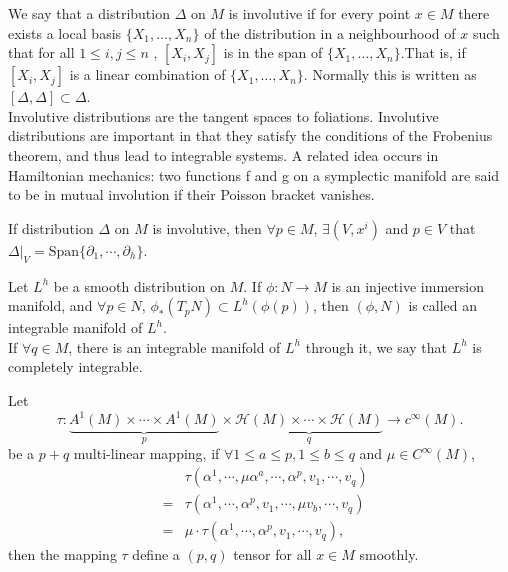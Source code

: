\begin{newdef}
We say that a distribution $\Delta$ on $M$ is involutive if for every point $x \in M$ there exists a local basis $\{X_{1},\ldots ,X_{n}\}$ of the distribution in a neighbourhood of $x$ such that for all $1\leq i,j\leq n$ , $[X_{i},X_{j}]$  is in the span of $\{X_{1},\ldots ,X_{n}\}$.That is, if $[X_{i},X_{j}]$ is a linear combination of $\{X_{1},\ldots ,X_{n}\}$. Normally this is written as $ [\Delta ,\Delta ]\subset \Delta $.\\
Involutive distributions are the tangent spaces to foliations. Involutive distributions are important in that they satisfy the conditions of the Frobenius theorem, and thus lead to integrable systems.
A related idea occurs in Hamiltonian mechanics: two functions f and g on a symplectic manifold are said to be in mutual involution if their Poisson bracket vanishes.
\end{newdef}

\begin{newthem}
 If distribution $\Delta$ on $M$ is involutive, then $\forall p \in M$, $\exists (V,x^i)$ and $p \in V$ that $\Delta|_{V} = \mathrm{Span} \{ \partial_{1} , \cdots, \partial_{h}\}$.
\end{newthem}

\begin{newdef}
Let $L^{h}$ be a smooth distribution on $M$. If $\phi:N \to M$ is an injective immersion manifold, and $\forall p \in N$, $\phi_{*}(T_pN) \subset L^h(\phi(p))$, then $(\phi,N)$ is called an integrable manifold of $L^h$.\\
If $\forall q \in M$, there is an integrable manifold of $L^h$ through it, we say that $L^h$ is completely integrable.
\end{newdef}
\begin{newthem}
Let
\[\tau: \underbrace{A^1(M) \times \cdots \times A^1(M)}_p \times \underbrace{\mathcal{H}(M) \times \cdots \times \mathcal{H}(M)}_q \to c^{\infty}(M).\] 
be a $p+q$ multi-linear mapping, if $\forall 1 \leq a \leq p,1 \leq b \leq q$ and $\mu \in C^{\infty}(M)$,
\begin{eqnarray}
&&\tau(\alpha^1,\cdots,\mu \alpha^{a},\cdots,\alpha^p,v_1,\cdots,v_q)\nonumber \\
&=&\tau(\alpha^1,\cdots,\alpha^p,v_1,\cdots,\mu v_{b},\cdots,v_q)\nonumber \\
&=&\mu \cdot \tau(\alpha^1,\cdots,\alpha^p,v_1,\cdots,v_q), \nonumber
\end{eqnarray}
then the mapping $\tau$ define a $(p,q)$ tensor for all $x \in M$ smoothly.
\end{newthem}


